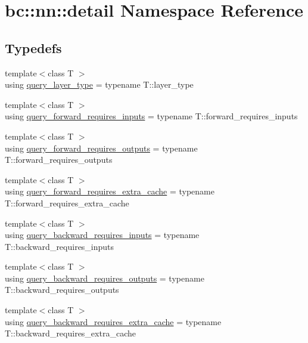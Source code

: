 \hypertarget{namespacebc_1_1nn_1_1detail}{}\section{bc\+:\+:nn\+:\+:detail Namespace Reference}
\label{namespacebc_1_1nn_1_1detail}
\subsection*{Typedefs}
\begin{DoxyCompactItemize}
\item 
{\footnotesize template$<$class T $>$ }\\using \hyperlink{namespacebc_1_1nn_1_1detail_a2ce86e248ef50dbd6eefccc1333e7814}{query\+\_\+layer\+\_\+type} = typename T\+::layer\+\_\+type
\item 
{\footnotesize template$<$class T $>$ }\\using \hyperlink{namespacebc_1_1nn_1_1detail_a93de41b72dd88c58d8f1d74276da87b3}{query\+\_\+forward\+\_\+requires\+\_\+inputs} = typename T\+::forward\+\_\+requires\+\_\+inputs
\item 
{\footnotesize template$<$class T $>$ }\\using \hyperlink{namespacebc_1_1nn_1_1detail_a10314a67405b06863c6384de87e36bad}{query\+\_\+forward\+\_\+requires\+\_\+outputs} = typename T\+::forward\+\_\+requires\+\_\+outputs
\item 
{\footnotesize template$<$class T $>$ }\\using \hyperlink{namespacebc_1_1nn_1_1detail_a51767bf55cf9cdf8cdff0f2929304390}{query\+\_\+forward\+\_\+requires\+\_\+extra\+\_\+cache} = typename T\+::forward\+\_\+requires\+\_\+extra\+\_\+cache
\item 
{\footnotesize template$<$class T $>$ }\\using \hyperlink{namespacebc_1_1nn_1_1detail_acb9ab0f627cee62dd68d673afc443608}{query\+\_\+backward\+\_\+requires\+\_\+inputs} = typename T\+::backward\+\_\+requires\+\_\+inputs
\item 
{\footnotesize template$<$class T $>$ }\\using \hyperlink{namespacebc_1_1nn_1_1detail_ad187de638865a7fbfe0e3c1db1511e4a}{query\+\_\+backward\+\_\+requires\+\_\+outputs} = typename T\+::backward\+\_\+requires\+\_\+outputs
\item 
{\footnotesize template$<$class T $>$ }\\using \hyperlink{namespacebc_1_1nn_1_1detail_a1599626f3fdc7ffbe459d9abf8325465}{query\+\_\+backward\+\_\+requires\+\_\+extra\+\_\+cache} = typename T\+::backward\+\_\+requires\+\_\+extra\+\_\+cache

\end{DoxyCompactItemize}
